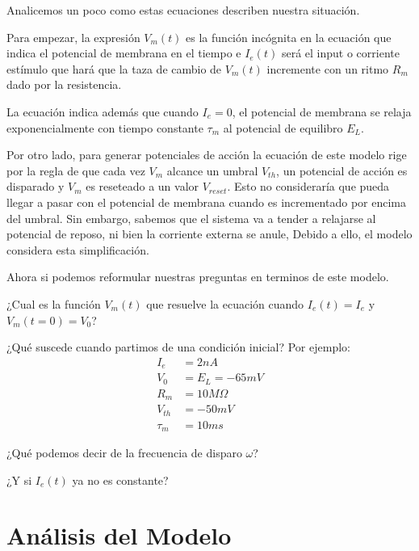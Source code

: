 \documentclass[10pt,journal,compsoc]{IEEEtran}
\begin{document}
Analicemos un poco como estas ecuaciones describen nuestra situación.

Para empezar, la expresión $V_m(t)$ es la función incógnita en la ecuación que
indica el potencial de membrana en el tiempo e $I_e(t)$ será el input o
corriente estímulo que hará que la taza de cambio de $V_m(t)$ incremente con un
ritmo $R_m$ dado por la resistencia.

La ecuación indica además que cuando $I_e = 0$, el potencial de membrana se
relaja exponencialmente con tiempo constante $\tau_m$ al potencial de equilibro
$E_L$.

Por otro lado, para generar potenciales de acción la ecuación de este modelo
rige por la regla de que cada vez $V_m$ alcance un umbral $V_{th}$, un potencial
de acción es disparado y $V_m$ es reseteado a un valor $V_{reset}$. Esto no
consideraría que pueda llegar a pasar con el potencial de membrana cuando es
incrementado por encima del umbral. Sin embargo, sabemos que el sistema va a
tender a relajarse al potencial de reposo, ni bien la corriente externa se
anule, Debido a ello, el modelo considera esta simplificación.

Ahora si podemos reformular nuestras preguntas en terminos de este modelo.
\begin{alphalist}
  \item ¿Cual es la función $V_m(t)$ que resuelve la ecuación cuando $I_e(t) =
  I_e$ y $V_m(t = 0) = V_0$?
  \item ¿Qué suscede cuando partimos de una condición inicial? Por ejemplo:
  \begin{equation*}
    \begin{aligned}
      I_e &= 2nA \\
      V_0 &= E_L = -65mV \\
      R_m &= 10M\Omega \\
      V_{th} &= -50mV \\
      \tau_m &= 10ms
    \end{aligned}
  \end{equation*}
  \item ¿Qué podemos decir de la frecuencia de disparo $\omega$?
  \item ¿Y si $I_e(t)$ ya no es constante?
\end{alphalist}

\section{Análisis del Modelo}
\end{document}
